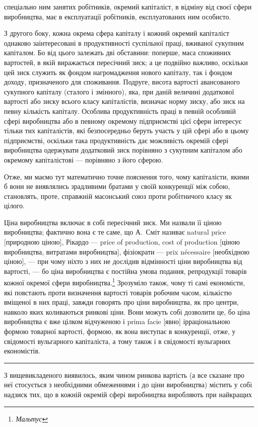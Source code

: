 \parcont{}  %
спеціально ним занятих робітників, окремий капіталіст, в відміну
від своєї сфери виробництва, має в експлуатації робітників, експлуатованих
ним особисто.

З другого боку, кожна окрема сфера капіталу і кожний окремий
капіталіст однаково заінтересовані в продуктивності суспільної
праці, вживаної сукупним капіталом. Бо від цього залежать
дві обставини: поперше, маса споживних вартостей, в якій виражається
пересічний зиск; а це подвійно важливо, оскільки цей
зиск служить як фондом нагромадження нового капіталу, так
і фондом доходу, призначеного для споживання. Подруге, висота
вартості авансованого сукупного капіталу (сталого і змінного),
яка, при даній величині додаткової вартості або зиску всього
класу капіталістів, визначає норму зиску, або зиск на певну
кількість капіталу. Особлива продуктивність праці в певній
особливій сфері виробництва або в певному окремому підприємстві
цієї сфери інтересує тільки тих капіталістів, які безпосередньо
беруть участь у цій сфері або в цьому підприємстві,
оскільки така продуктивність дає можливість окремій сфері
виробництва одержувати додатковий зиск порівняно з сукупним
капіталом або окремому капіталістові — порівняно з його сферою.

Отже, ми маємо тут математично точне пояснення того,
чому капіталісти, якими б вони не виявлялись зрадливими братами
у своїй конкуренції між собою, становлять, проте, справжній
масонський союз проти робітничого класу як цілого.

Ціна виробництва включає в собі пересічний зиск. Ми назвали
її ціною виробництва; фактично вона є те саме, що А.~Сміт називає
natural price [природною ціною], Рікардо — price of production,
cost of production [ціною виробництва, витратами виробництва],
фізіократи — prix nécessaire [необхідною ціною], — при
чому ніхто з них не дослідив відмінності ціни виробництва від
вартості, — бо ціна виробництва є постійна умова подання, репродукції
товарів кожної окремої сфери виробництва.\footnote{
\emph{Мальтус}
} Зрозуміло
також, чому ті самі економісти, які повстають проти визначення
вартості товарів робочим часом, кількістю вміщеної в них праці,
завжди говорять про ціни виробництва, як про центри, навколо
яких коливаються ринкові ціни. Вони можуть собі дозволити це,
бо ціна виробництва є вже цілком відчуженою і prima facie [явно]
ірраціональною формою товарної вартості, формою, як вона виступає
в конкуренції, отже, у свідомості вульгарного капіталіста,
а тому також і в свідомості вульгарних економістів.

\pfbreak

З вищевикладеного виявилось, яким чином ринкова вартість
(а все сказане про неї стосується з необхідними обмеженнями
і до ціни виробництва) містить у собі надзиск тих, що в кожній
окремій сфері виробництва виробляють при найкращих
\parbreak{}  %
